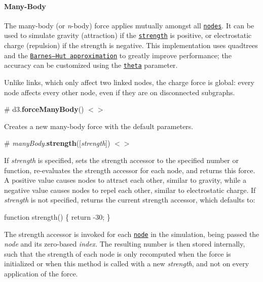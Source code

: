 \paragraph*{Many-\/\+Body}

The many-\/body (or {\itshape n}-\/body) force applies mutually amongst all \href{#simulation_nodes}{\tt nodes}. It can be used to simulate gravity (attraction) if the \href{#manyBody_strength}{\tt strength} is positive, or electrostatic charge (repulsion) if the strength is negative. This implementation uses quadtrees and the \href{https://en.wikipedia.org/wiki/Barnes–Hut_simulation}{\tt Barnes–\+Hut approximation} to greatly improve performance; the accuracy can be customized using the \href{#manyBody_theta}{\tt theta} parameter.

Unlike links, which only affect two linked nodes, the charge force is global\+: every node affects every other node, even if they are on disconnected subgraphs.

\label{_forceManyBody}%
\# d3.{\bfseries force\+Many\+Body}() \href{https://github.com/d3/d3-force/blob/master/src/manyBody.js}{\tt $<$$>$}

Creates a new many-\/body force with the default parameters.

\label{_manyBody_strength}%
\# {\itshape many\+Body}.{\bfseries strength}(\mbox{[}{\itshape strength}\mbox{]}) \href{https://github.com/d3/d3-force/blob/master/src/manyBody.js#L97}{\tt $<$$>$}

If {\itshape strength} is specified, sets the strength accessor to the specified number or function, re-\/evaluates the strength accessor for each node, and returns this force. A positive value causes nodes to attract each other, similar to gravity, while a negative value causes nodes to repel each other, similar to electrostatic charge. If {\itshape strength} is not specified, returns the current strength accessor, which defaults to\+:


\begin{DoxyCode}
function strength() \{
  return -30;
\}
\end{DoxyCode}


The strength accessor is invoked for each \href{#simulation_nodes}{\tt node} in the simulation, being passed the {\itshape node} and its zero-\/based {\itshape index}. The resulting number is then stored internally, such that the strength of each node is only recomputed when the force is initialized or when this method is called with a new {\itshape strength}, and not on every application of the force.

